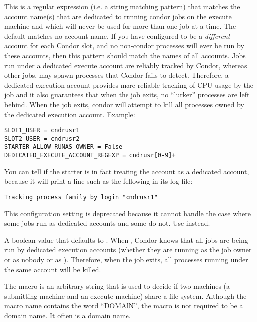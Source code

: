 \begin{description}
\label{param:DedicatedExecuteAccountRegexp}
\item[\Macro{DEDICATED\_EXECUTE\_ACCOUNT\_REGEXP}]
  This is a regular expression (i.e. a string matching pattern) that
  matches the account name(s) that are dedicated to running condor
  jobs on the execute machine and which will never be used for more
  than one job at a time.  The default matches no account name.  If
  you have configured  to be a \emph{different}
  account for each Condor slot, and no non-condor processes will ever be
  run by these accounts, then this pattern should match the names of
  all  accounts.  Jobs run under a dedicated
  execute account are reliably tracked by Condor, whereas other jobs,
  may spawn processes that Condor fails to detect.  Therefore, a
  dedicated execution account provides more reliable tracking of CPU
  usage by the job and it also guarantees that when the job exits, no
  ``lurker'' processes are left behind.  When the job exits, condor
  will attempt to kill all processes owned by the dedicated execution
  account.  Example:

\begin{verbatim}
SLOT1_USER = cndrusr1
SLOT2_USER = cndrusr2
STARTER_ALLOW_RUNAS_OWNER = False
DEDICATED_EXECUTE_ACCOUNT_REGEXP = cndrusr[0-9]+
\end{verbatim}

  You can tell if the starter is in fact treating the account as a
  dedicated account, because it will print a line such as the following
  in its log file:

\begin{verbatim}
Tracking process family by login "cndrusr1"
\end{verbatim}


\label{param:ExecuteLoginIsDedicated}
\item[\Macro{EXECUTE\_LOGIN\_IS\_DEDICATED}]
  This configuration setting is deprecated because it cannot handle the
  case where some jobs run as dedicated accounts and some do not.  Use
   instead.

  A boolean value that defaults to .  When ,
  Condor knows that all jobs are being run by dedicated execution
  accounts (whether they are running as the job owner or as nobody or as
  ).  Therefore, when the job exits, all processes
  running under the same account will be killed.

\label{param:FilesystemDomain}
\item[\Macro{FILESYSTEM\_DOMAIN}]
  The 
  macro is an arbitrary string that is used to decide if
  two machines (a submitting machine and an execute machine) share a
  file system.
  Although the macro name contains the word ``DOMAIN'',
  the macro is not required to be a domain name. 
  It often is a domain name.


\end{description}
